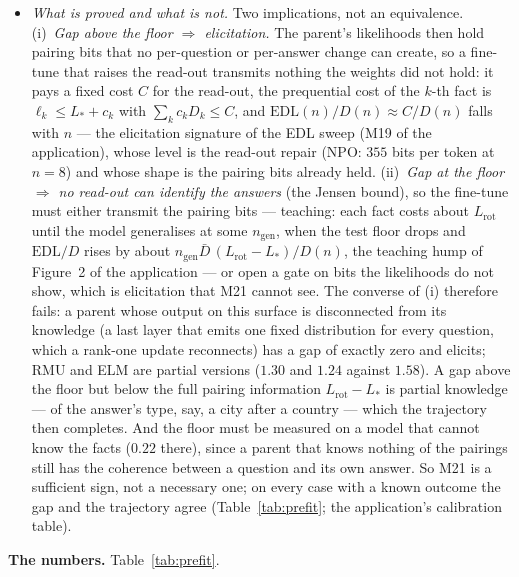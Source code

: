 \documentclass[11pt]{article}
\newcommand{\numbers}[1]{\par\noindent\textbf{The numbers.} #1\par\medskip}
\newenvironment{steps}{\begin{itemize}[nosep,leftmargin=1.2em,topsep=2pt]}{\end{itemize}}
\begin{document}
\begin{enumerate}[label=\textbf{M\arabic*}, leftmargin=*, itemsep=1.2em, resume]
{\begin{steps}
calibrations. A first-token preference is part of the full-answer gap, so M12 above its null
implies M21 above its floor unless the later tokens reverse it; the converse fails where the
first token is broken and the rest of the answer is not (NPO in the application: the four-way
first-token read-out at its null, the gap $2.5$ nats per token).
\item \emph{What is proved and what is not.} Two implications, not an equivalence.
(i)~\emph{Gap above the floor $\Rightarrow$ elicitation.} The parent's likelihoods then hold
pairing bits that no per-question or per-answer change can create, so a fine-tune that raises the
read-out transmits nothing the weights did not hold: it pays a fixed cost $C$ for the read-out,
the prequential cost of the $k$-th fact is $\ell_k\le L_*+c_k$ with $\sum_kc_kD_k\le C$, and
$\mathrm{EDL}(n)/D(n)\approx C/D(n)$ falls with $n$ --- the elicitation signature of the EDL sweep
(M19 of the application), whose level is the read-out repair (NPO: $355$ bits per token at
$n=8$) and whose shape is the pairing bits already held.
(ii)~\emph{Gap at the floor $\Rightarrow$ no read-out can identify the answers} (the Jensen
bound), so the fine-tune must either transmit the pairing bits --- teaching: each fact costs
about $L_{\mathrm{rot}}$ until the model generalises at some $n_{\mathrm{gen}}$, when the test
floor drops and $\mathrm{EDL}/D$ rises by about $n_{\mathrm{gen}}\bar D\,(L_{\mathrm{rot}}-L_*)/D(n)$,
the teaching hump of Figure~2 of the application --- or open a gate on bits the likelihoods do
not show, which is elicitation that M21 cannot see. The converse of (i) therefore fails: a
parent whose output on this surface is disconnected from its knowledge (a last layer that emits
one fixed distribution for every question, which a rank-one update reconnects) has a gap of
exactly zero and elicits; RMU and ELM are partial versions ($1.30$ and $1.24$ against $1.58$). A
gap above the floor but below the full pairing information $L_{\mathrm{rot}}-L_*$ is partial
knowledge --- of the answer's type, say, a city after a country --- which the trajectory then
completes. And the floor must be measured on a model that cannot know the facts ($0.22$ there),
since a parent that knows nothing of the pairings still has the coherence between a question and
its own answer. So M21 is a sufficient sign, not a necessary one; on every case with a known
outcome the gap and the trajectory agree (Table~\ref{tab:prefit}; the application's calibration
table).
\end{steps}}
\numbers{Table~\ref{tab:prefit}.
}
\end{enumerate}
\end{document}
